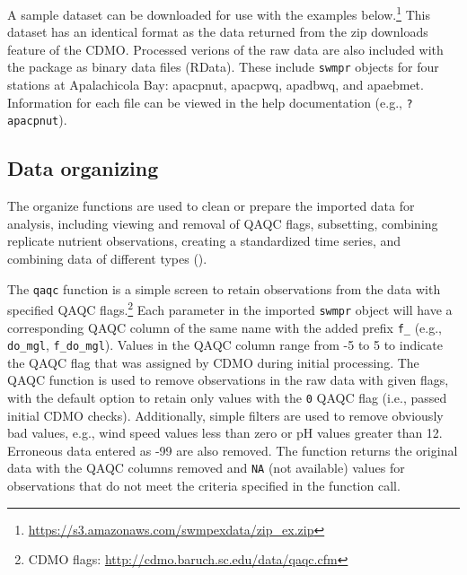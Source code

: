 \documentclass[10pt,letterpaper]{article}\usepackage[]{graphicx}\usepackage[]{color}
\begin{document}
A sample dataset can be downloaded for use with the examples below.\footnote{\url{https://s3.amazonaws.com/swmpexdata/zip_ex.zip}}  This dataset has an identical format as the data returned from the zip downloads feature of the \ac{CDMO}.  Processed verions of the raw data are also included with the package as binary data files (RData).  These include \texttt{swmpr} objects for four stations at Apalachicola Bay: apacpnut, apacpwq, apadbwq, and apaebmet.  Information for each file can be viewed in the help documentation (e.g., \texttt{?apacpnut}).

\subsection*{Data organizing}

The organize functions are used to clean or prepare the imported data for analysis, including viewing and removal of QAQC flags, subsetting, combining replicate nutrient observations, creating a standardized time series, and combining data of different types ().

The \texttt{qaqc} function is a simple screen to retain observations from the data with specified QAQC flags.\footnote{\ac{CDMO} flags: \url{http://cdmo.baruch.sc.edu/data/qaqc.cfm}} Each parameter in the imported \texttt{swmpr} object will have a corresponding QAQC column of the same name with the added prefix \texttt{f\_} (e.g., \texttt{do\_mgl}, \texttt{f\_do\_mgl}).  Values in the QAQC column range from -5 to 5 to indicate the \ac{QAQC} flag that was assigned by \ac{CDMO} during initial processing.  The \ac{QAQC} function is used to remove observations in the raw data with given flags, with the default option to retain only values with the \texttt{0} \ac{QAQC} flag (i.e., passed initial \ac{CDMO} checks).     Additionally, simple filters are used to remove obviously bad values, e.g., wind speed values less than zero or pH values greater than 12. Erroneous data entered as -99 are also removed. The function returns the original data with the QAQC columns removed and \texttt{NA} (not available) values for observations that do not meet the criteria specified in the function call.
\end{document}
